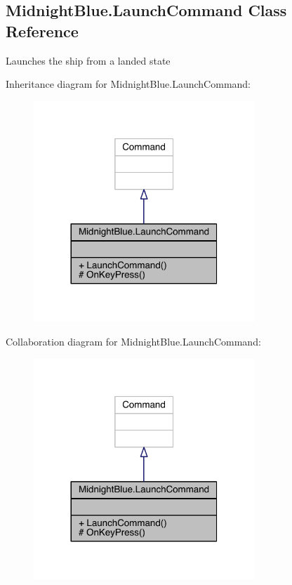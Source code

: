 \hypertarget{class_midnight_blue_1_1_launch_command}{}\subsection{Midnight\+Blue.\+Launch\+Command Class Reference}
\label{class_midnight_blue_1_1_launch_command}


Launches the ship from a landed state  




Inheritance diagram for Midnight\+Blue.\+Launch\+Command\+:\nopagebreak
\begin{figure}[H]
\begin{center}
\leavevmode
\includegraphics[width=236pt]{class_midnight_blue_1_1_launch_command__inherit__graph}
\end{center}
\end{figure}


Collaboration diagram for Midnight\+Blue.\+Launch\+Command\+:\nopagebreak
\begin{figure}[H]
\begin{center}
\leavevmode
\includegraphics[width=236pt]{class_midnight_blue_1_1_launch_command__coll__graph}
\end{center}
\end{figure}
